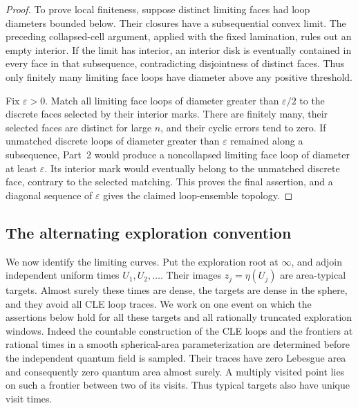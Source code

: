 \documentclass[11pt]{article}
\numberwithin{equation}{section}
\theoremstyle{definition}
\theoremstyle{remark}
\newcommand{\1}{\mathbf 1}
\begin{document}
\begin{proof}
To prove local finiteness, suppose distinct limiting faces had loop
diameters bounded below.  Their closures have a subsequential convex
limit.  The preceding collapsed-cell argument, applied with the fixed
lamination, rules out an empty interior.  If the limit has interior, an
interior disk is eventually contained in every face in that subsequence,
contradicting disjointness of distinct faces.  Thus only finitely many
limiting face loops have diameter above any positive threshold.

Fix $\varepsilon>0$.  Match all limiting face loops of diameter greater
than $\varepsilon/2$ to the discrete faces selected by their interior
marks.  There are finitely many, their selected faces are distinct for
large $n$, and their cyclic errors tend to zero.  If unmatched discrete
loops of diameter greater than $\varepsilon$ remained along a subsequence,
Part~2 would produce a noncollapsed limiting face loop of diameter at
least $\varepsilon$.  Its interior mark would eventually belong to the
unmatched discrete face, contrary to the selected matching.  This proves
the final assertion, and a diagonal sequence of $\varepsilon$ gives the
claimed loop-ensemble topology.
\end{proof}

\subsection{The alternating exploration convention}

We now identify the limiting curves.  Put the exploration root at
$\infty$, and adjoin independent uniform times $U_1,U_2,\ldots$.
Their images $z_j=\eta(U_j)$ are area-typical targets.  Almost surely
these times are dense, the targets are dense in the sphere, and they
avoid all CLE loop traces.  We work on
one event on which the assertions below hold for all these targets and
all rationally truncated exploration windows.
Indeed the countable construction of the CLE loops and the frontiers
at rational times in a smooth spherical-area parameterization
are determined before the independent quantum field is sampled.
Their traces have zero Lebesgue area and consequently zero quantum
area almost surely.  A multiply visited point lies on such a frontier
between two of its visits.  Thus typical targets also have unique
visit times.
\end{document}
